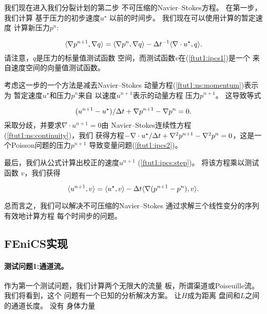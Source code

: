 我们现在进入我们分裂计划的第二步
不可压缩的Navier--Stokes方程。 在第一步，我们计算
基于压力的初步速度$u^{\star}$
以前的时间步。 我们现在可以使用计算的暂定速度
计算新压力$p^n$:

\begin{equation}
\label{ftut1:ipcs2}
  \langle \nabla p^{n+1}, \nabla q \rangle
  = \langle {\nabla p^{n}},{\nabla q} \rangle
  - \dt^{-1} \langle{\nabla \cdot u^{\star}},{q} \rangle.
\end{equation}
请注意，$q$是压力的标量值测试函数
空间，而测试函数$v$在(\ref{ftut1:ipcs1})是一个
来自速度空间的向量值测试函数。

考虑这一步的一个方法是减去Navier--Stokes
动量方程(\ref{ftut1:ns:momentum})表示为
暂定速度$u^{\star}$和压力$p^n$来自
以速度$u^{n+1}$表示的动量方程
压力$p^{n+1}$。 这导致等式

\begin{equation} \label{ftut1:ipcs:step}
  (u^{n+1} - u^{\star}) / \dt + \nabla p^{n+1} - \nabla p^n = 0.
\end{equation}
采取分歧，并要求$\nabla \cdot u^{n+1} = 0$由
Navier--Stokes连续性方程(\ref{ftut1:ns:continuity})，我们
获得方程$-\nabla\cdot u^{\star} / \dt + \nabla^2 p^{n+1} -
\nabla^2 p^n = 0$，这是一个Poisson问题的压力$p^{n+1}$
导致变量问题(\ref{ftut1:ipcs2})。

最后，我们从公式计算出校正的速度$u^{n+1}$
(\ref{ftut1:ipcs:step})。 将该方程乘以测试函数
$v$，我们获得

\begin{equation}
\label{ftut1:ipcs3}
  \langle {u^{n+1}},{v} \rangle
  =
  \langle {u^{\star}},{v} \rangle
  - \dt \langle {\nabla(p^{n+1}-p^{n})},{v} \rangle.
\end{equation}

总而言之，我们可以解决不可压缩的Navier--Stokes
通过求解三个线性变分的序列有效地计算方程
每个时间步的问题。

\subsection{FEniCS实现}

\paragraph{测试问题1:通道流。}

作为第一个测试问题，我们计算两个无限大的流量
板，所谓渠道或Poiseuille流。 我们将看到，这个
问题有一个已知的分析解决方案。 让$H$成为距离
盘间和$L$之间的通道长度。 没有
身体力量

